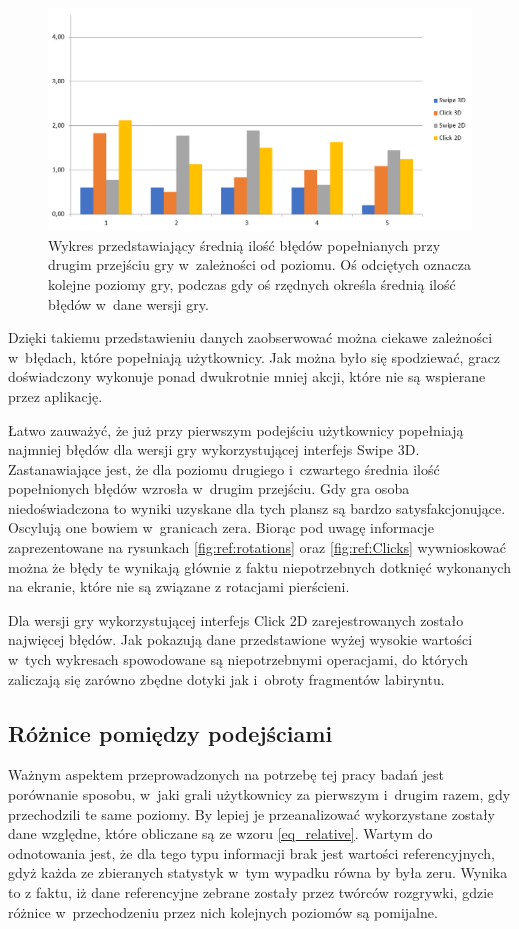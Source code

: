 \documentclass[a4paper,12pt,numbers=noenddot]{report}
\begin{document}
\begin{figure}[h!]
	\centering
  	\includegraphics[width=\linewidth]{diag/errors_2.png}
	\caption{Wykres przedstawiający średnią ilość błędów popełnianych przy drugim przejściu gry w~zależności od poziomu. Oś odciętych oznacza kolejne poziomy gry, podczas gdy oś rzędnych określa średnią ilość błędów w~dane wersji gry.}
	\label{fig:diag_errors_2}
\end{figure}

Dzięki takiemu przedstawieniu danych zaobserwować można ciekawe zależności w~błędach, które popełniają użytkownicy. Jak można było się spodziewać, gracz doświadczony wykonuje ponad dwukrotnie mniej akcji, które nie są wspierane przez aplikację. 

Łatwo zauważyć, że już przy pierwszym podejściu użytkownicy popełniają najmniej błędów dla wersji gry wykorzystującej interfejs Swipe 3D. Zastanawiające jest, że dla poziomu drugiego i~czwartego średnia ilość popełnionych błędów wzrosła w~drugim przejściu. Gdy gra osoba niedoświadczona to wyniki uzyskane dla tych plansz są bardzo satysfakcjonujące. Oscylują one bowiem w~granicach zera. Biorąc pod uwagę informacje zaprezentowane na rysunkach \ref{fig:ref:rotations} oraz \ref{fig:ref:Clicks} wywnioskować można że błędy te wynikają głównie z faktu niepotrzebnych dotknięć wykonanych na ekranie, które nie są związane z rotacjami pierścieni.

Dla wersji gry wykorzystującej interfejs Click 2D zarejestrowanych zostało najwięcej błędów. Jak pokazują dane przedstawione wyżej wysokie wartości w~tych wykresach spowodowane są niepotrzebnymi operacjami, do których zaliczają się zarówno zbędne dotyki jak i~obroty fragmentów labiryntu.

\subsection{Różnice pomiędzy podejściami}
Ważnym aspektem przeprowadzonych na potrzebę tej pracy badań jest porównanie sposobu, w~jaki grali użytkownicy za pierwszym i~drugim razem, gdy przechodzili te same poziomy. By lepiej je przeanalizować wykorzystane zostały dane względne, które obliczane są ze wzoru \ref{eq_relative}. Wartym do odnotowania jest, że dla tego typu informacji brak jest wartości referencyjnych, gdyż każda ze zbieranych statystyk w~tym wypadku równa by była zeru. Wynika to z faktu, iż dane referencyjne zebrane zostały przez twórców rozgrywki, gdzie różnice w~przechodzeniu przez nich kolejnych poziomów są pomijalne.
\end{document}
